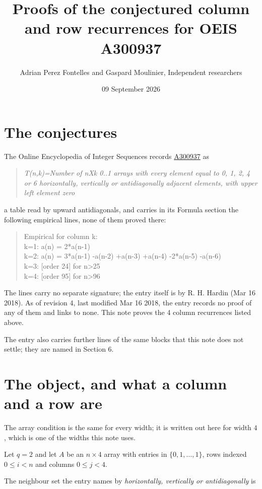 \documentclass[11pt]{article}
\title{Proofs of the conjectured column and row recurrences for OEIS A300937}
\author{Adrian Perez Fontelles and Gaspard Moulinier, Independent researchers}
\date{09 September 2026}
\theoremstyle{definition}
\begin{document}
\maketitle
\section{The conjectures}

The Online Encyclopedia of Integer Sequences records \href{https://oeis.org/A300937}{A300937} as

\begin{quote}\itshape T(n,k)=Number of nXk 0..1 arrays with every element equal to 0, 1, 2, 4 or 6 horizontally, vertically or antidiagonally adjacent elements, with upper left element zero\end{quote}

a table read by upward antidiagonals, and carries in its Formula section the following empirical lines, none of them proved there:

\begin{quote}\ttfamily Empirical for column k:\\
k=1: a(n) = 2*a(n-1)\\k=2: a(n) = 3*a(n-1) -a(n-2) +a(n-3) +a(n-4) -2*a(n-5) -a(n-6)\\k=3: [order 24] for n>25\\k=4: [order 95] for n>96\end{quote}

The lines carry no separate signature; the entry itself is by R. H. Hardin (Mar 16 2018). As of revision 4, last modified Mar 16 2018, the entry records no proof of any of them and links to none. This note proves the 4 column recurrences listed above.

The entry also carries further lines of the same blocks that this note does not settle; they are named in Section 6.

\section{The object, and what a column and a row are}

The array condition is the same for every width; it is written out here for width $4$, which is one of the widths this note uses.

Let $q = 2$ and let $A$ be an $n \times 4$ array with entries in $\{0,1,\dots,1\}$, rows indexed $0 \le i < n$ and columns $0 \le j < 4$.

The neighbour set the entry names by {\itshape horizontally, vertically or antidiagonally} is
\end{document}
